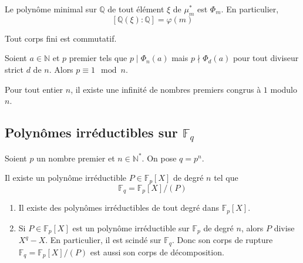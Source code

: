   \begin{corollary}
    Le polynôme minimal sur $\mathbb{Q}$ de tout élément $\xi$ de $\mu_m^*$ est $\Phi_m$. En particulier,
    \[ [\mathbb{Q}(\xi):\mathbb{Q}]=\varphi(m) \]
  \end{corollary}

  \begin{application}
    Tout corps fini est commutatif.
  \end{application}


  \begin{lemma}
    Soient $a \in \mathbb{N}$ et $p$ premier tels que $p \mid \Phi_n(a)$ mais $p \nmid \Phi_d(a)$ pour tout diviseur strict $d$ de $n$. Alors $p \equiv 1 \mod n$.
  \end{lemma}


  \begin{application}
    Pour tout entier $n$, il existe une infinité de nombres premiers congrus à $1$ modulo $n$.
  \end{application}

  \subsection{Polynômes irréductibles sur \texorpdfstring{$\mathbb{F}_q$}{Fq}}


  Soient $p$ un nombre premier et $n \in \mathbb{N}^*$. On pose $q = p^n$.

  \begin{theorem}
    Il existe un polynôme irréductible $P \in \mathbb{F}_p[X]$ de degré $n$ tel que
    \[ \mathbb{F}_q = \mathbb{F}_p[X] / (P) \]
  \end{theorem}

  \begin{corollary}
    \begin{enumerate}[label={\bfseries(\roman*)}]
      \item Il existe des polynômes irréductibles de tout degré dans $\mathbb{F}_p[X]$.
      \item Si $P \in \mathbb{F}_p[X]$ est un polynôme irréductible sur $\mathbb{F}_p$ de degré $n$, alors $P$ divise $X^q - X$. En particulier, il est scindé sur $\mathbb{F}_q$. Donc son corps de rupture $\mathbb{F}_q = \mathbb{F}_p[X] / (P)$ est aussi son corps de décomposition.
    \end{enumerate}
  \end{corollary}

